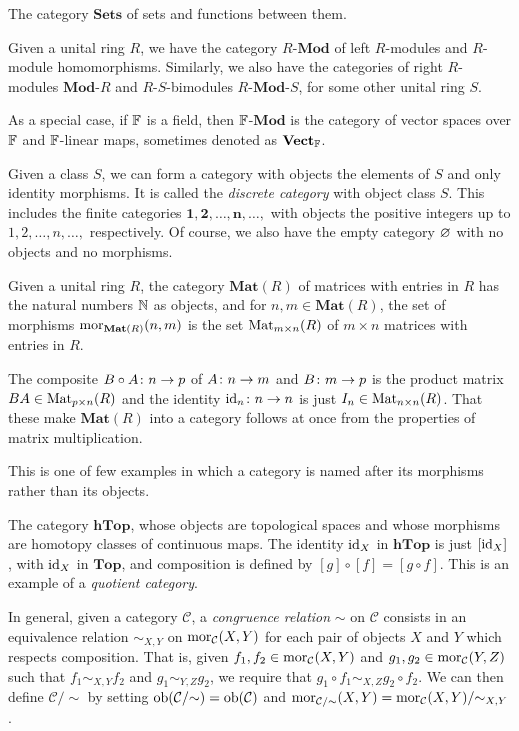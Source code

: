 \bs
\ben[label=(\alph*)]
\item 
\ben[label=(\roman*)]
\item The category $\mathbf{Sets}$ of sets and functions between them.
\item Given a unital ring $R$, we have the category $R$-$\mathbf{Mod}$ of left $R$-modules and $R$-module homomorphisms. Similarly, we also have the categories of right $R$-modules $\mathbf{Mod}$-$R$ and $R$-$S$-bimodules $R$-$\mathbf{Mod}$-$S$, for some other unital ring $S$.

As a special case, if $\mathbb{F}$ is a field, then $\mathbb{F}$-$\mathbf{Mod}$ is the category of vector spaces over $\mathbb{F}$ and $\mathbb{F}$-linear maps, sometimes denoted as $\mathbf{Vect}_{\mathbb{F}}$. 
\item Given a class $S$, we can form a category with objects the elements of $S$ and only identity morphisms. It is called the \emph{discrete category} with object class $S$. This includes the finite categories $\mathbf{1}, \mathbf{2},\ldots, \mathbf{n},\ldots,$ with objects the positive integers up to $1,2,\ldots,n,\ldots,$ respectively. Of course, we also have the empty category $\varnothing$ with no objects and no morphisms.  
\item Given a unital ring $R$, the category $\mathbf{Mat}(R)$ of matrices with entries in $R$ has the natural numbers $\mathbb{N}$ as objects, and for $n,m\in \mathbf{Mat}(R)$, the set of morphisms $\operatorname{mor}_{\mathbf{Mat}(R)}(n,m)$ is the set $\mathrm{Mat}_{m\times n}(R)$ of $m\times n$ matrices with entries in $R$.

The composite $B\circ A\colon n\to p$ of $A\colon n\to m$ and $B\colon m\to p$ is the product matrix $BA\in\mathrm{Mat}_{p\times n}(R)$ and the identity $\mathrm{id}_n\colon n\to n$ is just $I_n\in \mathrm{Mat}_{n\times n}(R)$. That these make $\mathbf{Mat}(R)$ into a category follows at once from the properties of matrix multiplication.

This is one of few examples in which a category is named after its morphisms rather than its objects.
\item The category $\mathbf{hTop}$, whose objects are topological spaces and whose morphisms are homotopy classes of continuous maps. The identity $\mathrm{id}_X$ in $\mathbf{hTop}$ is just $[\mathrm{id}_X]$, with $\mathrm{id}_X$ in $\mathbf{Top}$, and composition is defined by $[g]\circ [f]=[g\circ f]$. This is an example of a \emph{quotient category}.

In general, given a category $\mathcal{C}$, a \emph{congruence relation} $\sim$ on $\mathcal{C}$ consists in an equivalence relation $\sim_{X,Y}$ on $\operatorname{mor}_{\mathcal{C}}(X,Y)$ for each pair of objects $X$ and $Y$ which respects composition. That is, given $f_1,f_2\in\operatorname{mor}_{\mathcal{C}}(X,Y)$ and $g_1,g_2\in\operatorname{mor}_{\mathcal{C}}(Y,Z)$ such that $f_1\sim_{X,Y}f_2$ and $g_1\sim_{Y,Z}g_2$, we require that $g_1\circ f_1\sim_{X,Z}g_2\circ f_2$. We can then define $\mathcal{C}/{\sim}$ by setting $\operatorname{ob}(\mathcal{C}/{\sim})=\operatorname{ob}(\mathcal{C})$ and $\operatorname{mor}_{\mathcal{C}/{\sim}}(X,Y)=\operatorname{mor}_{\mathcal{C}}(X,Y)/{\sim_{X,Y}}$. 

